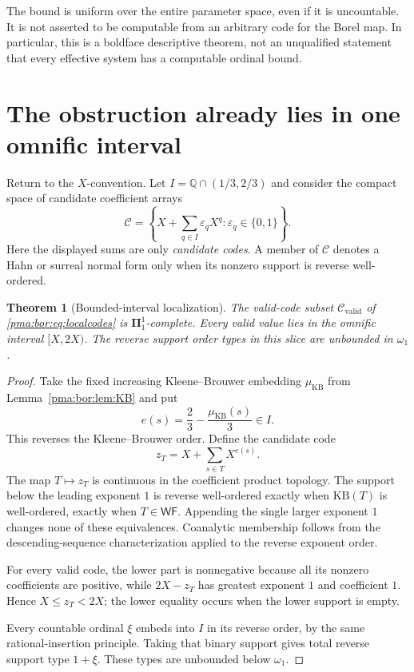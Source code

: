 \documentclass[11pt]{article}
\numberwithin{equation}{section}
\newtheorem{theorem}{Theorem}[section]
\theoremstyle{definition}
\theoremstyle{remark}
\newcommand{\Q}{\mathbb Q}
\newcommand{\WF}{\mathsf{WF}}
\newcommand{\muKB}{\mu_{\mathrm{KB}}}
\newcommand{\KB}{\mathrm{KB}}
\begin{document}
The bound is uniform over the entire parameter space, even if it is
uncountable. It is not asserted to be computable from an arbitrary code for
the Borel map. In particular, this is a boldface descriptive theorem, not an
unqualified statement that every effective system has a computable ordinal
bound.

\section{The obstruction already lies in one omnific interval}
\label{pma:bor:sec:local}

Return to the $X$-convention. Let $I=\Q\cap(1/3,2/3)$ and consider the compact
space of candidate coefficient arrays
\begin{equation}
\label{pma:bor:eq:localcodes}
 \mathcal C=\left\{X+\sum_{q\in I}\varepsilon_qX^q:
                   \varepsilon_q\in\{0,1\}\right\}.
\end{equation}
Here the displayed sums are only \emph{candidate codes}. A member of
$\mathcal C$ denotes a Hahn or surreal normal form only when its nonzero
support is reverse well-ordered.

\begin{theorem}[Bounded-interval localization]
\label{pma:bor:thm:local}
The valid-code subset $\mathcal C_{\mathrm{valid}}$ of
\eqref{pma:bor:eq:localcodes} is $\boldsymbol\Pi^1_1$-complete. Every valid value lies
in the omnific interval $[X,2X)$. The reverse support order types in this slice
are unbounded in $\omega_1$.
\end{theorem}
\begin{proof}
Take the fixed increasing Kleene--Brouwer embedding $\muKB$ from
Lemma~\ref{pma:bor:lem:KB} and put
\[
 e(s)=\frac23-\frac{\muKB(s)}3\in I.
\]
This reverses the Kleene--Brouwer order. Define the candidate code
\begin{equation}
\label{pma:bor:eq:zT}
 z_T=X+\sum_{s\in T}X^{e(s)}.
\end{equation}
The map $T\mapsto z_T$ is continuous in the coefficient product topology.
The support below the leading exponent $1$ is reverse well-ordered exactly
when $\KB(T)$ is well-ordered, exactly when $T\in\WF$. Appending the
single larger exponent $1$ changes none of these equivalences.
Coanalytic membership follows from the descending-sequence characterization
applied to the reverse exponent order.

For every valid code, the lower part is nonnegative because all its nonzero
coefficients are positive, while $2X-z_T$ has greatest exponent $1$ and
coefficient $1$. Hence $X\leq z_T<2X$; the lower equality occurs when the
lower support is empty.

Every countable ordinal $\xi$ embeds into $I$ in its reverse order, by the
same rational-insertion principle. Taking that binary support gives total
reverse support type $1+\xi$. These types are unbounded below $\omega_1$.
\end{proof}
\end{document}

